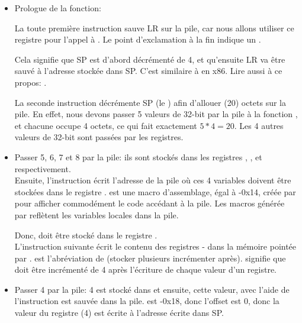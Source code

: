 \begin{itemize}
\item Prologue de la fonction:

La toute première instruction  sauve \ac{LR} sur la pile,
car nous allons utiliser ce registre pour l'appel à \printf.
Le point d'exclamation à la fin indique un .

Cela signifie que \ac{SP} est d'abord décrémenté de 4, et qu'ensuite \ac{LR}
va être sauvé à l'adresse stockée dans \ac{SP}.
C'est similaire à \PUSH en x86.
Lire aussi à ce propos: .

La seconde instruction  décrémente \ac{SP} (le )
afin d'allouer  (20) octets sur la pile.
En effet, nous devons passer 5 valeurs de 32-bit par la pile à la fonction \printf,
et chacune occupe 4 octets, ce qui fait exactement $5*4=20$.
Les 4 autres valeurs de 32-bit sont passées par les registres.

\item Passer 5, 6, 7 et 8 par la pile: ils sont stockés dans les registres ,
,  et  respectivement.\\
Ensuite, l'instruction  écrit l'adresse de la pile
où ces 4 variables doivent être stockées dans le registre .
 est une macro d'assemblage, égal à -0x14, créée par \IDA pour afficher
commodément le code accédant à la pile.
Les macros  générée par \IDA reflètent les variables locales dans la pile.

Donc,  doit être stocké dans le registre . \\
L'instruction suivante  écrit le contenu des registres
- dans la mémoire pointée par .
 est l'abréviation de  (stocker plusieurs incrémenter après).
 signifie que  doit être incrémenté de 4 après
l'écriture de chaque valeur d'un registre.

\item Passer 4 par la pile: 4 est stocké dans  et ensuite, cette valeur, avec l'aide de \\
l'instruction  est sauvée dans la pile.
 est -0x18, donc l'offset est 0, donc la valeur du registre 
(4) est écrite à l'adresse écrite dans \ac{SP}.


\end{itemize}
